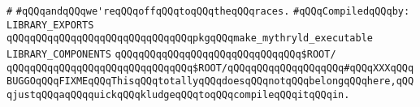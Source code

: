 \verb|#|\newline
\verb|#qQQqandqQQqwe'reqQQqoffqQQqtoqQQqtheqQQqraces.|\newline
\newline
\verb|#qQQqCompiledqQQqby:|\newline
\newline
\newline
\verb|LIBRARY_EXPORTS|\newline
\newline
\verb|qQQqqQQqqQQqqQQqqQQqqQQqqQQqqQQqpkgqQQqmake_mythryld_executable|\newline
\newline
\newline
\newline
\verb|LIBRARY_COMPONENTS|\newline
\newline
\verb|qQQqqQQqqQQqqQQqqQQqqQQqqQQqqQQq$ROOT/|\newline
\verb|qQQqqQQqqQQqqQQqqQQqqQQqqQQqqQQq$ROOT/|\verb|qQQqqQQqqQQqqQQqqQQq#qQQqXXXqQQqBUGGOqQQqFIXMEqQQqThisqQQqtotallyqQQqdoesqQQqnotqQQqbelongqQQqhere,qQQqjustqQQqaqQQqquickqQQqkludgeqQQqtoqQQqcompileqQQqitqQQqin.|\newline

